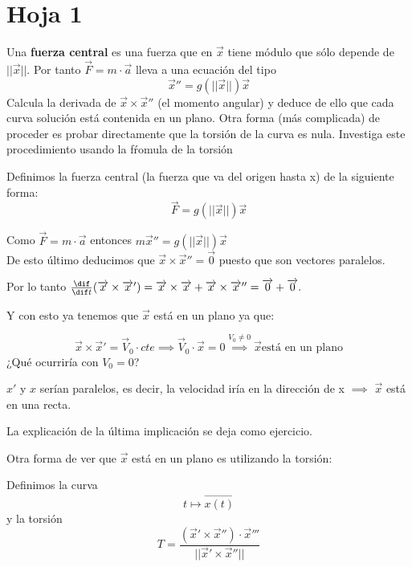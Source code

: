 \section{Hoja 1}
\begin{problem}[1]
Una \textbf{fuerza central} es una fuerza que en $\overrightarrow{x}$ tiene módulo que sólo depende de $||\overrightarrow{x}||$. Por tanto $\overrightarrow F=m\cdot \overrightarrow a$ lleva a una ecuación del tipo
\[\overrightarrow x '' =g(||\overrightarrow x||)\overrightarrow x\]
Calcula la derivada de $\overrightarrow x\times \overrightarrow  x''$ (el momento angular) y deduce de ello que cada curva solución está contenida en un plano. Otra forma (más complicada) de proceder es probar directamente que la torsión de la curva es nula. Investiga este procedimiento usando la fŕomula de la torsión

\solution
	Definimos la fuerza central (la fuerza que va del origen hasta x) de la siguiente forma:$$\overrightarrow F = g(||\overrightarrow x||) \overrightarrow x$$

	Como $\overrightarrow F = m \cdot \overrightarrow a$ entonces $m\overrightarrow x'' = g(||\overrightarrow x||) \overrightarrow x$\\
	De esto último deducimos que $\overrightarrow x \times \overrightarrow x'' = \overrightarrow 0$ puesto que son vectores paralelos.

	Por lo tanto $\frac{\dif}{\dif t}(\overrightarrow x \times \overrightarrow x') = \overrightarrow x \times \overrightarrow x + \overrightarrow x \times \overrightarrow x '' = \overrightarrow 0 + \overrightarrow 0.$

	Y con esto ya tenemos que $\overrightarrow x $ está en un plano ya que:

	$$\overrightarrow x \times \overrightarrow x' = \overrightarrow V_0 \cdot cte \implies \overrightarrow V_0 \cdot \overrightarrow x = 0 \stackrel{V_0 \neq 0}{\implies} \overrightarrow x \text{está en un plano}$$
	¿Qué ocurriría con $V_0 = 0$?

	$x'$ y $x$ serían paralelos, es decir, la velocidad iría en la dirección de x $\implies$ $\overrightarrow x$ está en una recta.

	La explicación de la última implicación se deja como ejercicio.

	Otra forma de ver que $\overrightarrow x$ está en un plano es utilizando la torsión:

	Definimos la curva
	\[t \mapsto \overrightarrow{x(t)}\]
	y la torsión
	\[T = \frac{(\overrightarrow x' \times \overrightarrow x'') \cdot \overrightarrow x'''}{||\overrightarrow x' \times \overrightarrow x ''||}\]


\end{problem}
